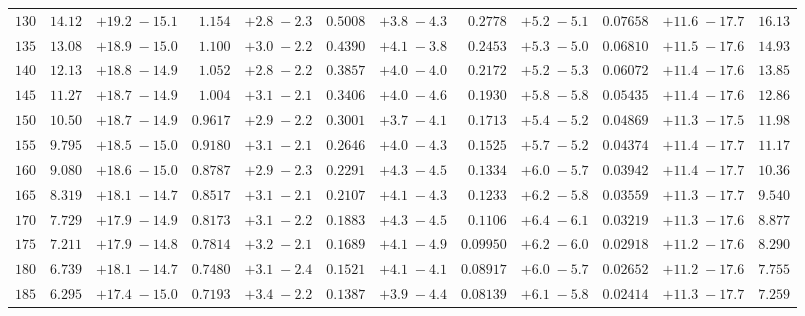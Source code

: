 \begin{landscape}
\begin{table}
\begin{center}
\begin{tabular}{r|rc|rc|rc|rc|rc|r}
 $ 130$ & $  14.12$ & $ +19.2 \; -\!15.1$ & $  1.154$ & $ +2.8 \; -\!2.3$ & $ 0.5008$ & $ +3.8 \; -\!4.3$ & $ 0.2778$ & $ +5.2 \; -\!5.1$ & $ 0.07658$ & $ +11.6 \; -\!17.7$ & $     16.13$ \\ 
 $ 135$ & $  13.08$ & $ +18.9 \; -\!15.0$ & $  1.100$ & $ +3.0 \; -\!2.2$ & $ 0.4390$ & $ +4.1 \; -\!3.8$ & $ 0.2453$ & $ +5.3 \; -\!5.0$ & $ 0.06810$ & $ +11.5 \; -\!17.6$ & $     14.93$ \\ 
 $ 140$ & $  12.13$ & $ +18.8 \; -\!14.9$ & $  1.052$ & $ +2.8 \; -\!2.2$ & $ 0.3857$ & $ +4.0 \; -\!4.0$ & $ 0.2172$ & $ +5.2 \; -\!5.3$ & $ 0.06072$ & $ +11.4 \; -\!17.6$ & $     13.85$ \\ 
 $ 145$ & $  11.27$ & $ +18.7 \; -\!14.9$ & $  1.004$ & $ +3.1 \; -\!2.1$ & $ 0.3406$ & $ +4.0 \; -\!4.6$ & $ 0.1930$ & $ +5.8 \; -\!5.8$ & $ 0.05435$ & $ +11.4 \; -\!17.6$ & $     12.86$ \\ 
 $ 150$ & $  10.50$ & $ +18.7 \; -\!14.9$ & $ 0.9617$ & $ +2.9 \; -\!2.2$ & $ 0.3001$ & $ +3.7 \; -\!4.1$ & $ 0.1713$ & $ +5.4 \; -\!5.2$ & $ 0.04869$ & $ +11.3 \; -\!17.5$ & $     11.98$ \\ 
 $ 155$ & $  9.795$ & $ +18.5 \; -\!15.0$ & $ 0.9180$ & $ +3.1 \; -\!2.1$ & $ 0.2646$ & $ +4.0 \; -\!4.3$ & $ 0.1525$ & $ +5.7 \; -\!5.2$ & $ 0.04374$ & $ +11.4 \; -\!17.7$ & $     11.17$ \\ 
 $ 160$ & $  9.080$ & $ +18.6 \; -\!15.0$ & $ 0.8787$ & $ +2.9 \; -\!2.3$ & $ 0.2291$ & $ +4.3 \; -\!4.5$ & $ 0.1334$ & $ +6.0 \; -\!5.7$ & $ 0.03942$ & $ +11.4 \; -\!17.7$ & $     10.36$ \\ 
 $ 165$ & $  8.319$ & $ +18.1 \; -\!14.7$ & $ 0.8517$ & $ +3.1 \; -\!2.1$ & $ 0.2107$ & $ +4.1 \; -\!4.3$ & $ 0.1233$ & $ +6.2 \; -\!5.8$ & $ 0.03559$ & $ +11.3 \; -\!17.7$ & $     9.540$ \\ 
 $ 170$ & $  7.729$ & $ +17.9 \; -\!14.9$ & $ 0.8173$ & $ +3.1 \; -\!2.2$ & $ 0.1883$ & $ +4.3 \; -\!4.5$ & $ 0.1106$ & $ +6.4 \; -\!6.1$ & $ 0.03219$ & $ +11.3 \; -\!17.6$ & $     8.877$ \\ 
 $ 175$ & $  7.211$ & $ +17.9 \; -\!14.8$ & $ 0.7814$ & $ +3.2 \; -\!2.1$ & $ 0.1689$ & $ +4.1 \; -\!4.9$ & $0.09950$ & $ +6.2 \; -\!6.0$ & $ 0.02918$ & $ +11.2 \; -\!17.6$ & $     8.290$ \\ 
 $ 180$ & $  6.739$ & $ +18.1 \; -\!14.7$ & $ 0.7480$ & $ +3.1 \; -\!2.4$ & $ 0.1521$ & $ +4.1 \; -\!4.1$ & $0.08917$ & $ +6.0 \; -\!5.7$ & $ 0.02652$ & $ +11.2 \; -\!17.6$ & $     7.755$ \\ 
 $ 185$ & $  6.295$ & $ +17.4 \; -\!15.0$ & $ 0.7193$ & $ +3.4 \; -\!2.2$ & $ 0.1387$ & $ +3.9 \; -\!4.4$ & $0.08139$ & $ +6.1 \; -\!5.8$ & $ 0.02414$ & $ +11.3 \; -\!17.7$ & $     7.259$ \\ 

\end{tabular}
\end{center}
\end{table}
\end{landscape}
